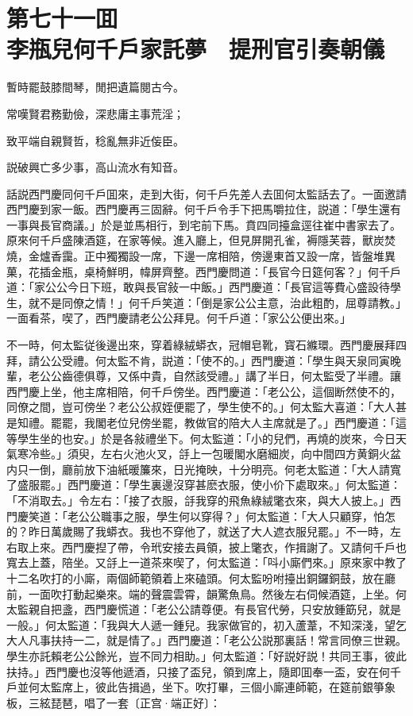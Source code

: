 
\chapter*{第七十一囬　\\李瓶兒何千戶家託夢　提刑官引奏朝儀}


\begin{myquote}
暫時罷鼓膝間琴，閒把遺篇閱古今。

常嘆賢君務勤儉，深悲庸主事荒淫；

致平端自親賢哲，稔亂無非近侫臣。

説破興亡多少事，高山流水有知音。
\end{myquote}

話説西門慶同何千戶囬來，走到大街，何千戶先差人去囬何太監話去了。一面邀請西門慶到家一飯。西門慶再三固辭。何千戶令手下把馬嚼拉住，説道：「學生還有一事與長官商議。」於是並馬相行，到宅前下馬。賁四同擡盒逕往崔中書家去了。原來何千戶盛陳酒筵，在家等候。進入廳上，但見屏開孔雀，褥隱芙蓉，獸炭焚燒，金爐香靄。正中獨獨設一席，下邊一席相陪，傍邊東首又設一席，皆盤堆異菓，花插金瓶，桌椅鮮明，幃屏齊整。西門慶問道：「長官今日筵何客？」何千戶道：「家公公今日下班，敢與長官敍一中飯。」西門慶道：「長官這等費心盛設待學生，就不是同僚之情！」何千戶笑道：「倒是家公公主意，治此粗酌，屈尊請教。」一面看茶，喫了，西門慶請老公公拜見。何千戶道：「家公公便出來。」

不一時，何太監従後邊出來，穿着綠絨蟒衣，冠帽皂靴，寳石縧環。西門慶展拜四拜，請公公受禮。何太監不肯，説道：「使不的。」西門慶道：「學生與天泉同寅晚輩，老公公齒德俱尊，又係中貴，自然該受禮。」講了半日，何太監受了半禮。讓西門慶上坐，他主席相陪，何千戶傍坐。西門慶道：「老公公，這個断然使不的，同僚之間，豈可傍坐？老公公叔姪便罷了，學生使不的。」何太監大喜道：「大人甚是知禮。罷罷，我閣老位兒傍坐罷，教做官的陪大人主席就是了。」西門慶道：「這等學生坐的也安。」於是各敍禮坐下。何太監道：「小的兒們，再燒的炭來，今日天氣寒冷些。」須臾，左右火池火叉，㧱上一包暖閣水磨細炭，向中間四方黄銅火盆内只一倒，廳前放下油紙暖簾來，日光掩映，十分明亮。何老太監道：「大人請寬了盛服罷。」西門慶道：「學生裏邊沒穿甚麽衣服，使小价下處取來。」何太監道：「不消取去。」令左右：「接了衣服，㧱我穿的飛魚綠絨氅衣來，與大人披上。」西門慶笑道：「老公公職事之服，學生何以穿得？」何太監道：「大人只顧穿，怕怎的？昨日萬歲賜了我蟒衣。我也不穿他了，就送了大人遮衣服兒罷。」不一時，左右取上來。西門慶揑了帶，令玳安接去員領，披上氅衣，作揖謝了。又請何千戶也寬去上蓋，陪坐。又㧱上一道茶來喫了，何太監道：「呌小廝們來。」原來家中教了十二名吹打的小廝，兩個師範領着上來磕頭。何太監吩咐擡出銅鑼銅鼓，放在廳前，一面吹打動起樂來。端的聲震雲霄，韻驚魚鳥。然後左右伺候酒筵，上坐。何太監親自把盞，西門慶慌道：「老公公請尊便。有長官代勞，只安放鍾筯兒，就是一般。」何太監道：「我與大人遞一鍾兒。我家做官的，初入蘆葦，不知深淺，望乞大人凡事扶持一二，就是情了。」西門慶道：「老公公説那裏話！常言同僚三世親。學生亦託賴老公公餘光，豈不同力相助。」何太監道：「好説好説！共同王事，彼此扶持。」西門慶也沒等他遞酒，只接了盃兒，領到席上，隨即囬奉一盃，安在何千戶並何太監席上，彼此告揖過，坐下。吹打畢，三個小廝連師範，在筵前銀箏象板，三絃琵琶，唱了一套〔正宫·端正好〕：

